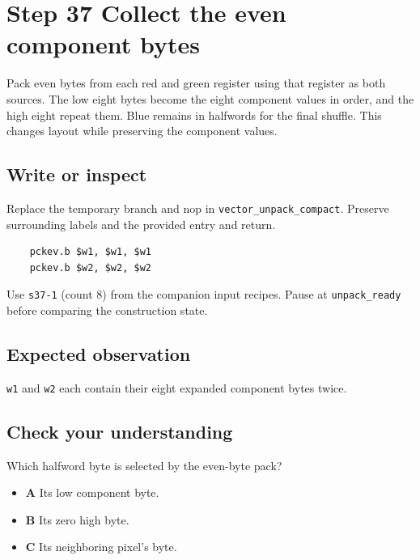 \section{Step 37 Collect the even component bytes}\label{rgb-s37}

Pack even bytes from each red and green register using that register as both sources. The low eight bytes become the eight component values in order, and the high eight repeat them. Blue remains in halfwords for the final shuffle. This changes layout while preserving the component values.

\subsection{Write or inspect}
Replace the temporary branch and nop in \texttt{vector\_unpack\_compact}. Preserve surrounding labels and the provided entry and return.

\begin{verbatim}
    pckev.b $w1, $w1, $w1
    pckev.b $w2, $w2, $w2
\end{verbatim}
Use \texttt{s37-1} (count 8) from the companion input recipes. Pause at \texttt{unpack\_ready} before comparing the construction state.

\subsection{Expected observation}
\texttt{w1} and \texttt{w2} each contain their eight expanded component bytes twice.

\subsection{Check your understanding}
Which halfword byte is selected by the even-byte pack?

\begin{itemize}
  \item \textbf{A} Its low component byte.
  \item \textbf{B} Its zero high byte.
  \item \textbf{C} Its neighboring pixel's byte.
\end{itemize}
